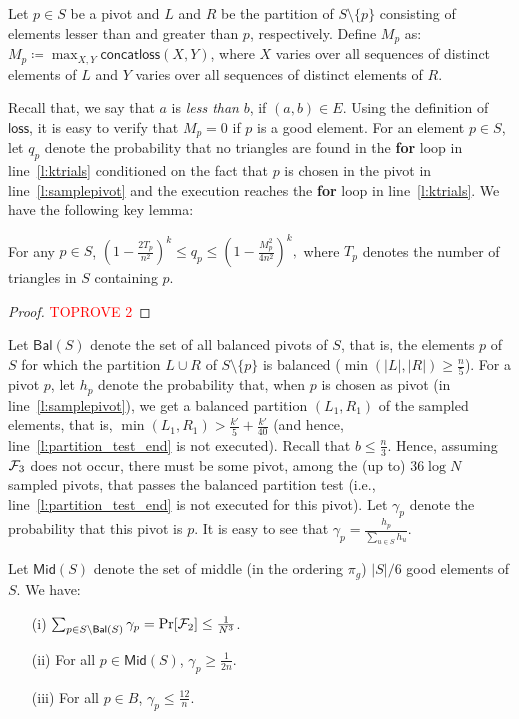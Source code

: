 \documentclass[11pt]{llncs}
\newcommand{\Mid}{{\mathsf{Mid}}}
\newcommand{\Bal}{{\mathsf{Bal}}}
\newcommand{\loss}{{\textsf{loss}}}
\newcommand{\conloss}{{\textsf{concatloss}}}
\begin{document}
\begin{definition}
    Let $p \in S$ be a pivot and $L$ and $R$ be the partition of $S \setminus \{p\}$ consisting of elements lesser than and greater than $p$, respectively. Define $M_p$ as: 
    $ M_p \coloneqq \max_{X, Y} \conloss(X,Y)$,
    where $X$ varies over all sequences of distinct elements of $L$ and $Y$ varies over all sequences of distinct elements of $R$. 
\end{definition}
Recall that, we say that $a$ is {\it less than} $b$, if $(a, b) \in E$. Using the definition of $\loss$, it is easy to verify that $M_p=0$ if $p$ is a good element. 
For an element $p \in S$, let $q_p$ denote the probability that no triangles are found in the {\bf for} loop in line~\ref{l:ktrials} conditioned on the fact that $p$ is chosen in the pivot in line~\ref{l:samplepivot} and the execution reaches the {\bf for} loop in line~\ref{l:ktrials}. We have the following key lemma: 
\begin{lemma}
    \label{lem:qp}
    For any $p \in S$,  $\left( 1 - \frac{2T_p}{n^2} \right)^k \leq q_p \leq \left( 1 - \frac{M_p^2}{4n^2} \right)^k,$ where $T_p$ denotes the number of triangles in $S$ containing $p$.
\end{lemma}
\begin{proof}\textcolor{red}{TOPROVE 2}\end{proof}

 Let $\Bal(S)$ denote the set of all balanced pivots of $S$, that is, the elements $p$ of $S$ for which the partition $L \cup R$ of $S \setminus \{p\}$ is balanced ($\min(|L|, |R|) \geq \frac{n}{5}$). For a pivot $p$, let $h_p$ denote the probability that, when $p$ is chosen as pivot (in line~\ref{l:samplepivot}),  we get a balanced partition $(L_1, R_1)$ of the sampled elements, that is, $\min(L_1, R_1) > \frac{k'}{5} + \frac{k'}{40}$ (and hence, line~\ref{l:partition_test_end} is not executed).  Recall that $b \leq \frac{n}{3}$. Hence, assuming ${\cal F}_3$ does not occur, there must be some pivot, among the (up to) $36 \log N$ sampled pivots, that passes the balanced partition test (i.e., line~\ref{l:partition_test_end} is not executed for this pivot). Let $\gamma_p$ denote the probability that this pivot is $p$. It is easy to see that $\gamma_p = \frac{h_p}{\sum_{u \in S} h_u}$.

\begin{lemma}
\label{lem:gamma_bound}
    Let $\Mid(S)$ denote the set of middle (in the ordering $\pi_g$) $|S|/6$ good elements of $S$. We have:
    \begin{itemize}
        \item[(i)] $\sum_{p \in S \setminus \Bal(S)} \gamma_p = \Pr[{\cal F}_2] \leq \frac{1}{N^3}$.
        \item[(ii)] For all $p \in \Mid(S)$, $\gamma_p \geq \frac{1}{2n} $.
        \item[(iii)] For all $p \in B$, $\gamma_p \leq \frac{12}{n}$.
    \end{itemize}
\end{lemma}
\end{document}
